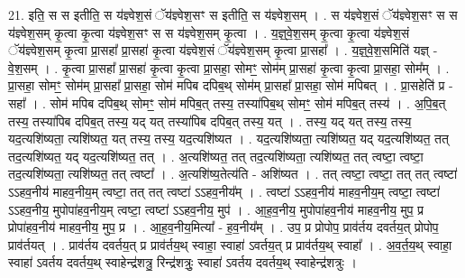 \documentclass[17pt]{extarticle}
\begin{document}
21. इति॒ स स इतीति॒ स य॑ज्ञ्वेश॒सं ॅय॑ज्ञ्वेश॒सꣳ स इतीति॒ स य॑ज्ञ्वेश॒सम् । . स य॑ज्ञ्वेश॒सं ॅय॑ज्ञ्वेश॒सꣳ स स य॑ज्ञ्वेश॒सम् कृ॒त्वा कृ॒त्वा य॑ज्ञ्वेश॒सꣳ स स य॑ज्ञ्वेश॒सम् कृ॒त्वा । . य॒ज्ञ्॒वे॒श॒सम् कृ॒त्वा कृ॒त्वा य॑ज्ञ्वेश॒सं ॅय॑ज्ञ्वेश॒सम् कृ॒त्वा प्रा॒सहा᳚ प्रा॒सहा॑ कृ॒त्वा य॑ज्ञ्वेश॒सं ॅय॑ज्ञ्वेश॒सम् कृ॒त्वा प्रा॒सहा᳚ । . य॒ज्ञ्॒वे॒श॒समिति॑ यज्ञ् - वे॒श॒सम् । . कृ॒त्वा प्रा॒सहा᳚ प्रा॒सहा॑ कृ॒त्वा कृ॒त्वा प्रा॒सहा॒ सोमꣳ॒॒ सोम॑म् प्रा॒सहा॑ कृ॒त्वा कृ॒त्वा प्रा॒सहा॒ सोम᳚म् । . प्रा॒सहा॒ सोमꣳ॒॒ सोम॑म् प्रा॒सहा᳚ प्रा॒सहा॒ सोम॑ मपिब दपिब॒थ् सोम॑म् प्रा॒सहा᳚ प्रा॒सहा॒ सोम॑ मपिबत् । . प्रा॒सहेति॑ प्र - सहा᳚ । . सोम॑ मपिब दपिब॒थ् सोमꣳ॒॒ सोम॑ मपिब॒त् तस्य॒ तस्या॑पिब॒थ् सोमꣳ॒॒ सोम॑ मपिब॒त् तस्य॑ । . अ॒पि॒ब॒त् तस्य॒ तस्या॑पिब दपिब॒त् तस्य॒ यद् यत् तस्या॑पिब दपिब॒त् तस्य॒ यत् । . तस्य॒ यद् यत् तस्य॒ तस्य॒ यद॒त्यशि॑ष्यता॒ त्यशि॑ष्यत॒ यत् तस्य॒ तस्य॒ यद॒त्यशि॑ष्यत । . यद॒त्यशि॑ष्यता॒ त्यशि॑ष्यत॒ यद् यद॒त्यशि॑ष्यत॒ तत् तद॒त्यशि॑ष्यत॒ यद् यद॒त्यशि॑ष्यत॒ तत् । . अ॒त्यशि॑ष्यत॒ तत् तद॒त्यशि॑ष्यता॒ त्यशि॑ष्यत॒ तत् त्वष्टा॒ त्वष्टा॒ तद॒त्यशि॑ष्यता॒ त्यशि॑ष्यत॒ तत् त्वष्टा᳚ । . अ॒त्यशि॑ष्य॒तेत्य॑ति - अशि॑ष्यत । . तत् त्वष्टा॒ त्वष्टा॒ तत् तत् त्वष्टा॑ ऽऽहव॒नीय॑ माहव॒नीय॒म् त्वष्टा॒ तत् तत् त्वष्टा॑ ऽऽहव॒नीय᳚म् । . त्वष्टा॑ ऽऽहव॒नीय॑ माहव॒नीय॒म् त्वष्टा॒ त्वष्टा॑ ऽऽहव॒नीय॒ मुपोपा॑हव॒नीय॒म् त्वष्टा॒ त्वष्टा॑ ऽऽहव॒नीय॒ मुप॑ । . आ॒ह॒व॒नीय॒ मुपोपा॑हव॒नीय॑ माहव॒नीय॒ मुप॒ प्र प्रोपा॑हव॒नीय॑ माहव॒नीय॒ मुप॒ प्र । . आ॒ह॒व॒नीय॒मित्या᳚ - ह॒व॒नीय᳚म् । . उप॒ प्र प्रोपोप॒ प्राव॑र्तय दवर्तय॒त् प्रोपोप॒ प्राव॑र्तयत् । . प्राव॑र्तय दवर्तय॒त् प्र प्राव॑र्तय॒थ् स्वाहा॒ स्वाहा॑ ऽवर्तय॒त् प्र प्राव॑र्तय॒थ् स्वाहा᳚ । . अ॒व॒र्त॒य॒थ् स्वाहा॒ स्वाहा॑ ऽवर्तय दवर्तय॒थ् स्वाहेन्द्र॑शत्रु॒ रिन्द्र॑शत्रुः॒ स्वाहा॑ ऽवर्तय दवर्तय॒थ् स्वाहेन्द्र॑शत्रुः । \newline
\end{document}
